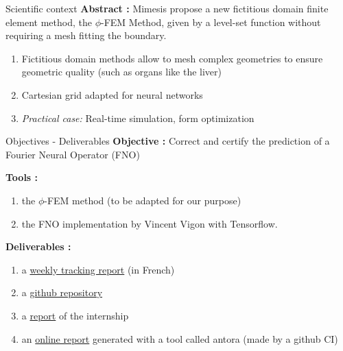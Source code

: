 \documentclass[compress,10pt,xcolor={table,dvipsnames},t]{beamer}
\begin{document}
	\begin{frame}{Scientific context}
		\textbf{Abstract :} Mimesis propose a new fictitious domain finite element method, the $\phi$-FEM Method, given by a level-set function without requiring a mesh fitting the boundary. 
		
		\begin{enumerate}[\ding{217}]
			\item Fictitious domain methods allow to mesh complex geometries to ensure geometric quality (such as organs like the liver)
			\item Cartesian grid adapted for neural networks
			\item \textit{Practical case:} Real-time simulation, form optimization
		\end{enumerate}
		
		\begin{center}
		\end{center}		
	\end{frame}

	\begin{frame}{Objectives - Deliverables}
		\textbf{Objective :} Correct and certify the prediction of a Fourier Neural Operator (FNO)
		
		\textbf{Tools :} 
		
		\begin{enumerate}[\ding{217}]
			\item the $\phi$-FEM method (to be adapted for our purpose) 
			\item the FNO implementation by Vincent Vigon with Tensorflow.
		\end{enumerate}
		
		\textbf{Deliverables :}

		\begin{enumerate}[\ding{217}]
			\item a \href{https://github.com/flecourtier/phifem_stage/blob/main/docs/suivi/suivi.pdf}{weekly tracking report} (in French)
			\item a \href{https://github.com/flecourtier/phifem_stage}{github repository}
			\item a \href{https://csmi.cemosis.fr/csmi-stages-2023/m2/_attachments/Lecourtier-Fr\%C3\%A9d\%C3\%A9rique.pdf}{report} of the internship
			\item an \href{https://flecourtier.github.io/phifem_stage/phifem_project/1.0.3/main_page.html}{online report} generated with a tool called antora (made by a github CI)
		\end{enumerate}
	\end{frame}
\end{document}
